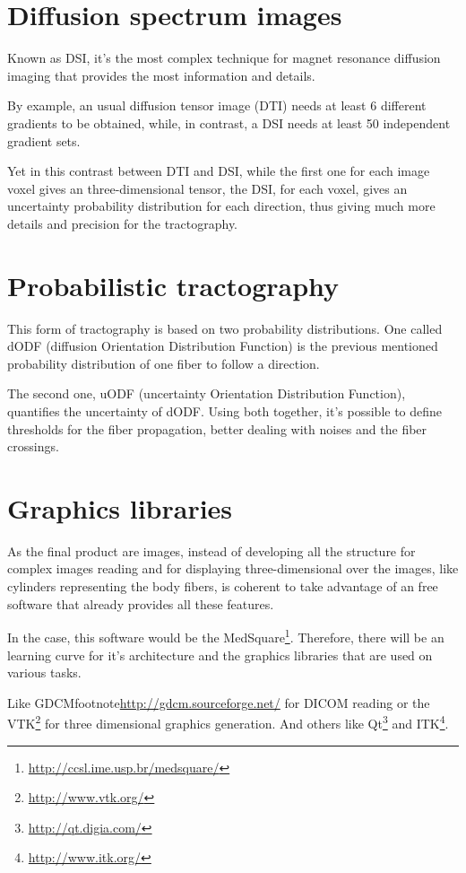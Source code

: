\documentclass[a4paper,11pt]{report}
\begin{document}
  \section{Diffusion spectrum images}
  Known as DSI, it's the most complex technique for magnet resonance diffusion imaging that provides the most information and details.

  By example, an usual diffusion tensor image (DTI) needs at least 6 different gradients to be obtained, while, in contrast, a DSI needs at least 50 independent gradient sets.

  Yet in this contrast between DTI and DSI, while the first one for each image voxel gives an three-dimensional tensor, the DSI, for each voxel, gives an uncertainty probability distribution for each direction, thus giving much more details and precision for the tractography.

  \section{Probabilistic tractography}
  This form of tractography is based on two probability distributions. One called dODF (diffusion Orientation Distribution Function) is the previous mentioned probability distribution of one fiber to follow a direction.

  The second one, uODF (uncertainty Orientation Distribution Function), quantifies the uncertainty of dODF. Using both together, it's possible to define thresholds for the fiber propagation, better dealing with noises and the fiber crossings.

  \section{Graphics libraries}
  As the final product are images, instead of developing all the structure for complex images reading and for displaying three-dimensional over the images, like cylinders representing the body fibers, is coherent to take advantage of an free software that already provides all these features.

  In the case, this software would be the MedSquare\footnote{\url{http://ccsl.ime.usp.br/medsquare/}}. Therefore, there will be an learning curve for it's architecture and the graphics libraries that are used on various tasks.

  Like GDCMfootnote{\url{http://gdcm.sourceforge.net/}} for DICOM reading or the VTK\footnote{\url{http://www.vtk.org/}} for three dimensional graphics generation. And others like Qt\footnote{\url{http://qt.digia.com/}} and ITK\footnote{\url{http://www.itk.org/}}.
  
\end{document}
